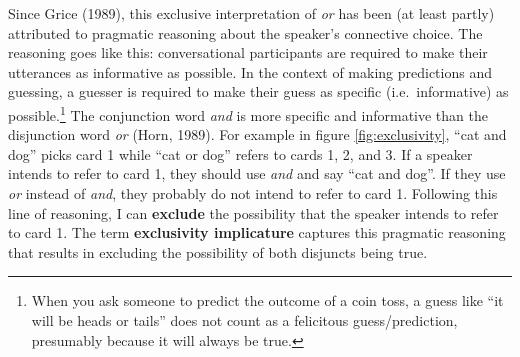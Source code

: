 \documentclass[oneside]{report}
\theoremstyle{definition}
\theoremstyle{definition}
\theoremstyle{definition}
\theoremstyle{remark}
\begin{document}
Since Grice (1989), this exclusive interpretation of \emph{or} has been
(at least partly) attributed to pragmatic reasoning about the speaker's
connective choice. The reasoning goes like this: conversational
participants are required to make their utterances as informative as
possible. In the context of making predictions and guessing, a guesser
is required to make their guess as specific (i.e.~informative) as
possible.\footnote{When you ask someone to predict the outcome of a coin
  toss, a guess like ``it will be heads or tails'' does not count as a
  felicitous guess/prediction, presumably because it will always be
  true.} The conjunction word \emph{and} is more specific and
informative than the disjunction word \emph{or} (Horn, 1989). For
example in figure \ref{fig:exclusivity}, ``cat and dog'' picks card 1
while ``cat or dog'' refers to cards 1, 2, and 3. If a speaker intends
to refer to card 1, they should use \emph{and} and say ``cat and dog''.
If they use \emph{or} instead of \emph{and}, they probably do not intend
to refer to card 1. Following this line of reasoning, I can
\textbf{exclude} the possibility that the speaker intends to refer to
card 1. The term \textbf{exclusivity implicature} captures this
pragmatic reasoning that results in excluding the possibility of both
disjuncts being true.
\end{document}
